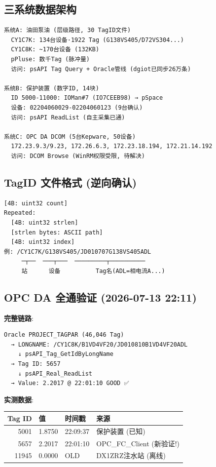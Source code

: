\documentclass[12pt,a4paper]{ctexart}
\begin{document}
\subsection{三系统数据架构}
\begin{verbatim}
系统A: 油田泵油 (层级路径, 30 TagID文件)
  CY1C7K: 134台设备·1922 Tag (G138VS405/D72VS304...)
  CY1C8K: ~170台设备 (132KB)
  pPluse: 数千Tag (脉冲量)
  访问: psAPI Tag Query + Oracle管线 (dgiot已同步26万条)

系统B: 保护装置 (数字ID, 14块)
  ID 5000-11000: IOMan#7 (IO7CEEB98) → pSpace
  设备: 02204060029-02204060123 (9台确认)
  访问: psAPI ReadList (自主采集已通)

系统C: OPC DA DCOM (5台Kepware, 50设备)
  172.23.9.3/9.23, 172.26.6.3, 172.23.18.194, 172.21.14.192
  访问: DCOM Browse (WinRM权限受限, 待解决)
\end{verbatim}

\subsection{TagID 文件格式 (逆向确认)}
\begin{verbatim}
[4B: uint32 count]
Repeated:
  [4B: uint32 strlen]
  [strlen bytes: ASCII path]
  [4B: uint32 index]
例: /CY1C7K/G138VS405/JD010707G138VS405ADL
     ─┬──  ───┬───  ─────────┬──────────
     站      设备          Tag名(ADL=相电流A...)
\end{verbatim}

\subsection{OPC DA 全通验证 (2026-07-13 22:11)}

\textbf{完整链路}:
\begin{verbatim}
Oracle PROJECT_TAGPAR (46,046 Tag)
  → LONGNAME: /CY1C8K/B1VD4VF20/JD010810B1VD4VF20ADL
    ↓ psAPI_Tag_GetIdByLongName
  → Tag ID: 5657
    ↓ psAPI_Real_ReadList
  → Value: 2.2017 @ 22:01:10 GOOD ✅
\end{verbatim}

\textbf{实测数据}:
\begin{table}[H]\centering
\begin{tabular}{rlll}
\toprule
\textbf{Tag ID} & \textbf{值} & \textbf{时间戳} & \textbf{来源} \\
\midrule
5001 & 1.8750 & 22:09:37 & 保护装置 (已知) \\
5657 & 2.2017 & 22:01:10 & OPC\_FC\_Client (新验证!) \\
11945 & 0.0000 & OLD & DX1ZRZ注水站 (离线) \\
\bottomrule
\end{tabular}
\end{table}
\end{document}
